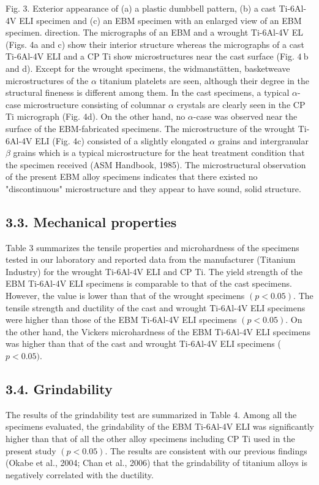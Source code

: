 \documentclass[10pt]{article}
\begin{document}
Fig. 3. Exterior appearance of (a) a plastic dumbbell pattern, (b) a cast Ti-6Al-4V ELI specimen and (c) an EBM specimen with an enlarged view of an EBM specimen. direction. The micrographs of an EBM and a wrought Ti-6Al-4V EL (Figs. 4a and c) show their interior structure whereas the micrographs of a cast Ti-6Al-4V ELI and a CP Ti show microstructures near the cast surface (Fig. $4 \mathrm{~b}$ and d). Except for the wrought specimens, the widmanstätten, basketweave microstructures of the $\alpha$ titanium platelets are seen, although their degree in the structural fineness is different among them. In the cast specimens, a typical $\alpha$-case microstructure consisting of columnar $\alpha$ crystals are clearly seen in the CP Ti micrograph (Fig. 4d). On the other hand, no $\alpha$-case was observed near the surface of the EBM-fabricated specimens. The microstructure of the wrought Ti-6Al-4V ELI (Fig. 4c) consisted of a slightly elongated $\alpha$ grains and intergranular $\beta$ grains which is a typical microstructure for the heat treatment condition that the specimen received (ASM Handbook, 1985). The microstructural observation of the present EBM alloy specimens indicates that there existed no "discontinuous" microstructure and they appear to have sound, solid structure.

\subsection*{3.3. Mechanical properties}
Table 3 summarizes the tensile properties and microhardness of the specimens tested in our laboratory and reported data from the manufacturer (Titanium Industry) for the wrought Ti-6Al-4V ELI and CP Ti. The yield strength of the EBM Ti-6Al-4V ELI specimens is comparable to that of the cast specimens. However, the value is lower than that of the wrought specimens $(p<0.05)$. The tensile strength and ductility of the cast and wrought Ti-6Al-4V ELI specimens were higher than those of the EBM Ti-6Al-4V ELI specimens $(p<0.05)$. On the other hand, the Vickers microhardness of the EBM Ti-6Al-4V ELI specimens was higher than that of the cast and wrought Ti-6Al-4V ELI specimens ( $p<0.05)$.

\subsection*{3.4. Grindability}
The results of the grindability test are summarized in Table 4. Among all the specimens evaluated, the grindability of the EBM Ti-6Al-4V ELI was significantly higher than that of all the other alloy specimens including CP Ti used in the present study $(p<0.05)$. The results are consistent with our previous findings (Okabe et al., 2004; Chan et al., 2006) that the grindability of titanium alloys is negatively correlated with the ductility.
\end{document}
